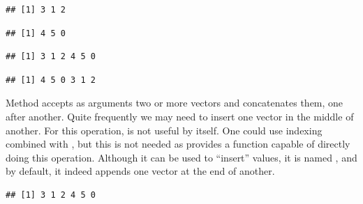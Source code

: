 \documentclass[krantz2]{krantz}\usepackage{knitr}
\begin{document}
\begin{knitrout}\footnotesize
{}\color{fgcolor}\begin{kframe}
\begin{alltt}
 \hlkwb{<-} \hlstd{(}\hlstd{,} \hlstd{,} \hlstd{)}
\end{alltt}
\begin{verbatim}
## [1] 3 1 2
\end{verbatim}
\begin{alltt}
 \hlkwb{<-} \hlstd{(}\hlstd{,} \hlstd{,} \hlstd{)}
\end{alltt}
\begin{verbatim}
## [1] 4 5 0
\end{verbatim}
\begin{alltt}
 \hlkwb{<-} 
\end{alltt}
\begin{verbatim}
## [1] 3 1 2 4 5 0
\end{verbatim}
\begin{alltt}
 \hlkwb{<-} 
\end{alltt}
\begin{verbatim}
## [1] 4 5 0 3 1 2
\end{verbatim}
\end{kframe}
\end{knitrout}

Method  accepts as arguments two or more vectors and concatenates them, one after another. Quite frequently we may need to insert one vector in the middle of another. For this operation,  is not useful by itself. One could use indexing combined with , but this is not needed as \Rlang provides a function capable of directly doing this operation. Although it can be used to ``insert'' values, it is named , and by default, it indeed appends one vector at the end of another.

\begin{knitrout}\footnotesize
{}\color{fgcolor}\begin{kframe}
\begin{alltt}
\end{alltt}
\begin{verbatim}
## [1] 3 1 2 4 5 0
\end{verbatim}
\end{kframe}
\end{knitrout}
\end{document}
